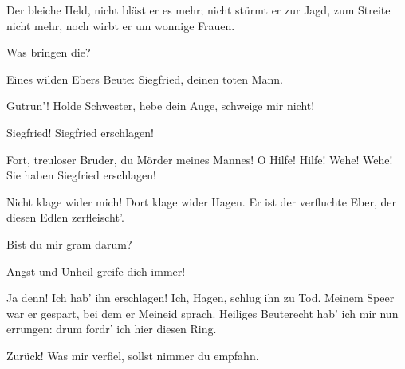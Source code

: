 \begin{drama}
Der bleiche Held,
nicht bläst er es mehr;
nicht stürmt er zur Jagd,
zum Streite nicht mehr,
noch wirbt er um wonnige Frauen.
 

\Gutrunespeaks



Was bringen die?
 




\Hagenspeaks

Eines wilden Ebers Beute:
Siegfried, deinen toten Mann.
 




\Guntherspeaks



Gutrun'! Holde Schwester,
hebe dein Auge, schweige mir nicht!
 

\Gutrunespeaks



Siegfried! Siegfried erschlagen!


Fort, treuloser Bruder,
du Mörder meines Mannes!
O Hilfe! Hilfe! Wehe! Wehe!
Sie haben Siegfried erschlagen!
 

\Guntherspeaks

Nicht klage wider mich!
Dort klage wider Hagen.
Er ist der verfluchte Eber,
der diesen Edlen zerfleischt'.
 

\Hagenspeaks

Bist du mir gram darum?
 

\Guntherspeaks

Angst und Unheil greife dich immer!
 

\Hagenspeaks



Ja denn! Ich hab' ihn erschlagen!
Ich, Hagen, schlug ihn zu Tod.
Meinem Speer war er gespart,
bei dem er Meineid sprach.
Heiliges Beuterecht
hab' ich mir nun errungen:
drum fordr' ich hier diesen Ring.
 

\Guntherspeaks

Zurück! Was mir verfiel,
sollst nimmer du empfahn.
 

\Hagenspeaks


\end{drama}
